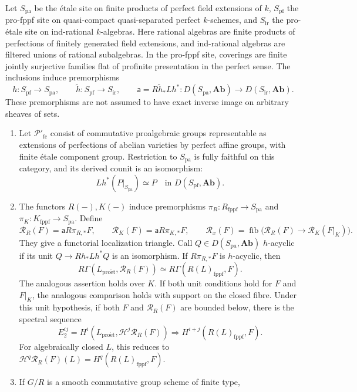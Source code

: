 \begin{theorem}
Let $S_{\mathrm{pa}}$ be the étale site on finite products of perfect
field extensions of $k$, $S_{\mathrm{pf}}$ the pro-fppf site on
quasi-compact quasi-separated perfect $k$-schemes, and
$S_{\mathrm{ir}}$ the pro-étale site on ind-rational $k$-algebras.
Here rational algebras are finite products of perfections of finitely
generated field extensions, and ind-rational algebras are filtered
unions of rational subalgebras. In the pro-fppf site, coverings are
finite jointly surjective families flat of profinite presentation in
the perfect sense. The inclusions induce premorphisms
\[
 h:S_{\mathrm{pf}}\to S_{\mathrm{pa}},\qquad
 \widetilde h:S_{\mathrm{pf}}\to S_{\mathrm{ir}},\qquad
 \mathsf a=R\widetilde h_*Lh^*:
 D(S_{\mathrm{pa}},\mathbf{Ab})\to D(S_{\mathrm{ir}},\mathbf{Ab}).
\]
These premorphisms are not assumed to have exact inverse image on
arbitrary sheaves of sets.
\begin{enumerate}
\item Let $\mathcal P'_{\mathrm{fc}}$ consist of commutative
proalgebraic groups representable as extensions of perfections of
abelian varieties by perfect affine groups, with finite étale component
group. Restriction to $S_{\mathrm{pa}}$ is fully faithful on this
category, and its derived counit is an isomorphism:
\[
 Lh^*(P|_{S_{\mathrm{pa}}})\simeq P
 \quad\text{in }D(S_{\mathrm{pf}},\mathbf{Ab}).
\]
\item The functors $R(-),K(-)$ induce premorphisms
$\pi_R:R_{\mathrm{fppf}}\to S_{\mathrm{pa}}$ and
$\pi_K:K_{\mathrm{fppf}}\to S_{\mathrm{pa}}$. Define
\[
 \mathcal R_R(F)=\mathsf aR\pi_{R,*}F,\qquad
 \mathcal R_K(F)=\mathsf aR\pi_{K,*}F,\qquad
 \mathcal R_x(F)=
 \operatorname{fib}\bigl(\mathcal R_R(F)\to\mathcal R_K(F|_K)\bigr).
\]
They give a functorial localization triangle.
Call $Q\in D(S_{\mathrm{pa}},\mathbf{Ab})$ $h$-acyclic if its unit
$Q\to Rh_*Lh^*Q$ is an isomorphism. If $R\pi_{R,*}F$ is
$h$-acyclic, then
\[
 R\Gamma(L_{\mathrm{pro\acute et}},\mathcal R_R(F))
 \simeq R\Gamma(R(L)_{\mathrm{fppf}},F).
\]
The analogous assertion holds over $K$. If both unit conditions hold
for $F$ and $F|_K$, the analogous comparison holds with support on
the closed fibre. Under this unit hypothesis, if both $F$ and
$\mathcal R_R(F)$ are bounded below, there is the spectral sequence
\[
 E_2^{ij}=
 H^i(L_{\mathrm{pro\acute et}},\mathcal H^j\mathcal R_R(F))
 \Longrightarrow H^{i+j}(R(L)_{\mathrm{fppf}},F).
\]
For algebraically closed $L$, this reduces to
$\mathcal H^q\mathcal R_R(F)(L)=H^q(R(L)_{\mathrm{fppf}},F)$.
\item If $G/R$ is a smooth commutative group scheme of finite type,

\end{enumerate}
\end{theorem}
